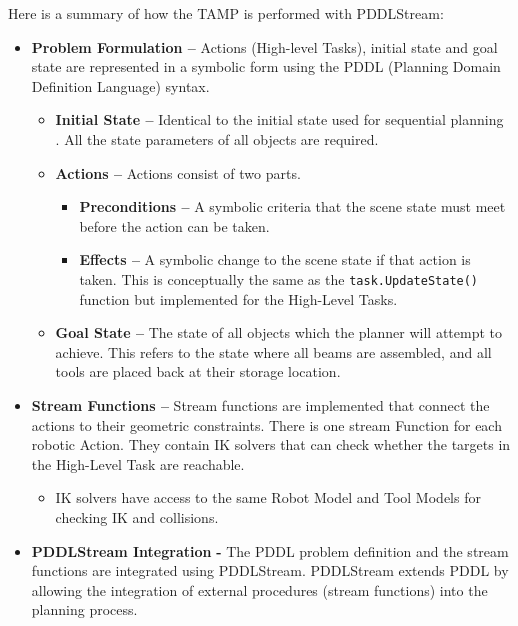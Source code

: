 Here is a summary of how the TAMP is performed with PDDLStream:

\begin{itemize}
	\item \textbf{Problem Formulation --} Actions (High-level Tasks), initial state and goal state are represented in a symbolic form using the PDDL (Planning Domain Definition Language) syntax.

\begin{itemize}
	\item \textbf{Initial State --} Identical to the initial state used for sequential planning . All the state parameters of all objects are required.

	\item \textbf{Actions --} Actions consist of two parts. 

\begin{itemize}
	\item \textbf{Preconditions --} A symbolic criteria that the scene state must meet before the action can be taken. 

	\item \textbf{Effects --} A symbolic change to the scene state if that action is taken. This is conceptually the same as the \verb|task.UpdateState()| function  but implemented for the High-Level Tasks.

\end{itemize}
	\item \textbf{Goal State --} The state of all objects which the planner will attempt to achieve. This refers to the state where all beams are assembled, and all tools are placed back at their storage location.

\end{itemize}
	\item \textbf{Stream Functions --} Stream functions are implemented that connect the actions to their geometric constraints. There is one stream Function for each robotic Action. They contain IK solvers that can check whether the targets in the High-Level Task are reachable.

\begin{itemize}
	\item IK solvers have access to the same Robot Model and Tool Models  for checking IK and collisions.

\end{itemize}
	\item \textbf{PDDLStream Integration} \textbf{-} The PDDL problem definition and the stream functions are integrated using PDDLStream. PDDLStream extends PDDL by allowing the integration of external procedures (stream functions) into the planning process.


\end{itemize}
